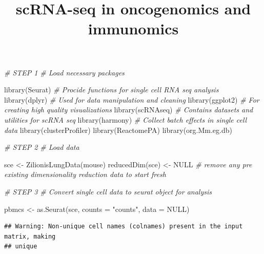 \documentclass[
]{article}
\title{scRNA-seq in oncogenomics and immunomics}
\author{}
\date{\vspace{-2.5em}}
\newenvironment{Shaded}{\begin{snugshade}}{\end{snugshade}}
\newcommand{\AttributeTok}[1]{\textcolor[rgb]{0.77,0.63,0.00}{#1}}
\newcommand{\CommentTok}[1]{\textcolor[rgb]{0.56,0.35,0.01}{\textit{#1}}}
\newcommand{\ConstantTok}[1]{\textcolor[rgb]{0.00,0.00,0.00}{#1}}
\newcommand{\FunctionTok}[1]{\textcolor[rgb]{0.00,0.00,0.00}{#1}}
\newcommand{\NormalTok}[1]{#1}
\newcommand{\OtherTok}[1]{\textcolor[rgb]{0.56,0.35,0.01}{#1}}
\newcommand{\StringTok}[1]{\textcolor[rgb]{0.31,0.60,0.02}{#1}}
\begin{document}
\maketitle

\begin{Shaded}
\begin{Highlighting}[]
\CommentTok{\# STEP 1}
\CommentTok{\# Load necessary packages }

\FunctionTok{library}\NormalTok{(Seurat)   }\CommentTok{\# Procide functions for single cell RNA seq analysis}
\FunctionTok{library}\NormalTok{(dplyr)   }\CommentTok{\# Used for data manipulation and cleaning  }
\FunctionTok{library}\NormalTok{(ggplot2)  }\CommentTok{\# For creating high quality visualizations}
\FunctionTok{library}\NormalTok{(scRNAseq)  }\CommentTok{\# Contains datasets and utilities for scRNA seq}
\FunctionTok{library}\NormalTok{(harmony) }\CommentTok{\# Collect batch effects in single cell data}
\FunctionTok{library}\NormalTok{(clusterProfiler) }
\FunctionTok{library}\NormalTok{(ReactomePA)}
\FunctionTok{library}\NormalTok{(org.Mm.eg.db)}
\end{Highlighting}
\end{Shaded}

\begin{Shaded}
\begin{Highlighting}[]
\CommentTok{\# STEP 2}
\CommentTok{\# Load data}

\NormalTok{sce }\OtherTok{\textless{}{-}} \FunctionTok{ZilionisLungData}\NormalTok{(}\StringTok{\textquotesingle{}mouse\textquotesingle{}}\NormalTok{)}
\FunctionTok{reducedDim}\NormalTok{(sce) }\OtherTok{\textless{}{-}} \ConstantTok{NULL} \CommentTok{\# remove any pre existing dimensionality reduction data to start fresh}
\end{Highlighting}
\end{Shaded}

\begin{Shaded}
\begin{Highlighting}[]
\CommentTok{\# STEP 3}
\CommentTok{\# Convert single cell data to seurat object for analysis}

\NormalTok{pbmcs }\OtherTok{\textless{}{-}} \FunctionTok{as.Seurat}\NormalTok{(sce, }\AttributeTok{counts =} \StringTok{"counts"}\NormalTok{, }\AttributeTok{data =} \ConstantTok{NULL}\NormalTok{) }
\end{Highlighting}
\end{Shaded}

\begin{verbatim}
## Warning: Non-unique cell names (colnames) present in the input matrix, making
## unique
\end{verbatim}
\end{document}
